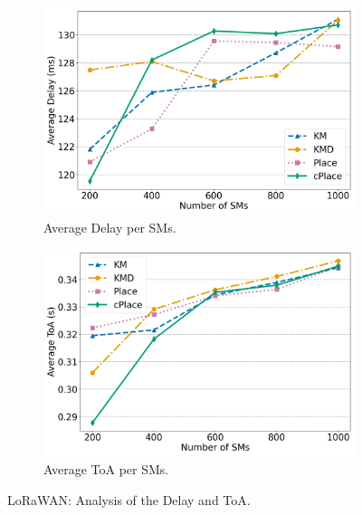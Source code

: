 \documentclass[a4paper,fleqn]{cas-dc}
\begin{document}
\begin{figure}
    \centering
    \begin{subfigure}{0.48\textwidth}
        \centering
        \includegraphics[width=\linewidth]{imgs/delay.png}
        \caption{Average Delay per \gls{SMs}.}
        \label{fig:delay}
    \end{subfigure}
    \hfill
    \begin{subfigure}{0.48\textwidth}
        \centering
        \includegraphics[width=\linewidth]{imgs/toa.png}
        \caption{Average ToA per \gls{SMs}.}
        \label{fig:toa}
    \end{subfigure}
    \caption{LoRaWAN: Analysis of the Delay and ToA.}
    \label{fig:delay_toa}
\end{figure}
\end{document}
